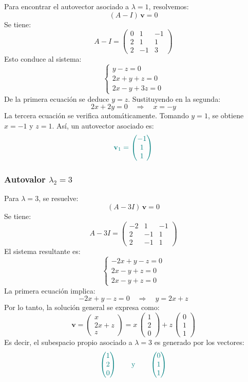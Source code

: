 \documentclass{article}
\begin{document}
\begin{enumerate}[label=\textbf{\alph*)}]
Para encontrar el autovector asociado a \(\lambda = 1\), resolvemos:
\[
(A - I)\,\mathbf{v} = 0
\]
Se tiene:
\[
A - I =
\begin{pmatrix}
0 & 1 & -1\\
2 & 1 & 1\\
2 & -1 & 3
\end{pmatrix}
\]
Esto conduce al sistema:
\[
\begin{cases}
y - z = 0\\
2x + y + z = 0\\
2x - y + 3z = 0
\end{cases}
\]
De la primera ecuación se deduce \(y = z\). Sustituyendo en la segunda:
\[
2x + 2y = 0
\quad\Longrightarrow\quad
x = -y
\]
La tercera ecuación se verifica automáticamente.  
Tomando \(y = 1\), se obtiene \(x = -1\) y \(z = 1\).  
Así, un autovector asociado es:
\[
\color{teal}
\mathbf{v}_1 =
\begin{pmatrix}
-1\\
1\\
1
\end{pmatrix}
\]

\subsubsection*{Autovalor \(\lambda_2 = 3\)}

Para \(\lambda = 3\), se resuelve:
\[
(A - 3I)\,\mathbf{v} = 0
\]
Se tiene:
\[
A - 3I =
\begin{pmatrix}
-2 & 1 & -1\\
2 & -1 & 1\\
2 & -1 & 1
\end{pmatrix}
\]
El sistema resultante es:
\[
\begin{cases}
-2x + y - z = 0\\
2x - y + z = 0\\
2x - y + z = 0
\end{cases}
\]
La primera ecuación implica:
\[
-2x + y - z = 0
\quad\Longrightarrow\quad
y = 2x + z
\]
Por lo tanto, la solución general se expresa como:
\[
\mathbf{v} =
\begin{pmatrix}
x\\
2x+z\\
z
\end{pmatrix}
=
x\,\begin{pmatrix}
1\\
2\\
0
\end{pmatrix}
+
z\,\begin{pmatrix}
0\\
1\\
1
\end{pmatrix}
\]
Es decir, el subespacio propio asociado a \(\lambda = 3\) es generado por los vectores:
\[
\color{teal}
\begin{pmatrix}
1\\
2\\
0
\end{pmatrix}
\qquad\text{y}\qquad
\begin{pmatrix}
0\\
1\\
1
\end{pmatrix}
\]



\end{enumerate}
\end{document}
